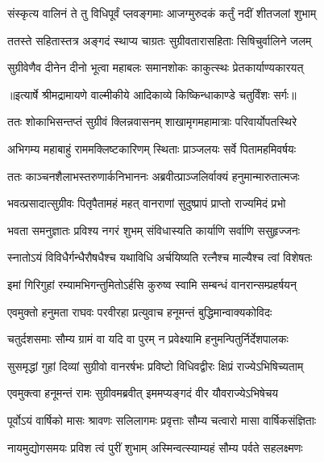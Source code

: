 \twolineshloka
{संस्कृत्य वालिनं ते तु विधिपूर्वं प्लवङ्गमाः}
{आजग्मुरुदकं कर्तुं नदीं शीतजलां शुभाम्} %

\twolineshloka
{ततस्ते सहितास्तत्र अङ्गदं स्थाप्य चाग्रतः}
{सुग्रीवतारासहिताः सिषिचुर्वालिने जलम्} %

\twolineshloka
{सुग्रीवेणैव दीनेन दीनो भूत्वा महाबलः}
{समानशोकः काकुत्स्थः प्रेतकार्याण्यकारयत्} %


{॥इत्यार्षे श्रीमद्रामायणे वाल्मीकीये आदिकाव्ये किष्किन्धाकाण्डे चतुर्विंशः सर्गः॥}


\twolineshloka
{ततः शोकाभिसन्तप्तं सुग्रीवं क्लिन्नवासनम्}
{शाखामृगमहामात्राः परिवार्योपतस्थिरे} %

\twolineshloka
{अभिगम्य महाबाहुं राममक्लिष्टकारिणम्}
{स्थिताः प्राञ्जलयः सर्वे पितामहमिवर्षयः} %

\twolineshloka
{ततः काञ्चनशैलाभस्तरुणार्कनिभाननः}
{अब्रवीत्प्राञ्जलिर्वाक्यं हनुमान्मारुतात्मजः} %

\twolineshloka
{भवत्प्रसादात्सुग्रीवः पितृपैतामहं महत्}
{वानराणां सुदुष्प्रापं प्राप्तो राज्यमिदं प्रभो} %

\twolineshloka
{भवता समनुज्ञातः प्रविश्य नगरं शुभम्}
{संविधास्यति कार्याणि सर्वाणि ससुहृज्जनः} %

\twolineshloka
{स्नातोऽयं विविधैर्गन्धैरौषधैश्च यथाविधि}
{अर्चयिष्यति रत्नैश्च माल्यैश्च त्वां विशेषतः} %

\twolineshloka
{इमां गिरिगुहां रम्यामभिगन्तुमितोऽर्हसि}
{कुरुष्व स्वामि सम्बन्धं वानरान्सम्प्रहर्षयन्} %

\twolineshloka
{एवमुक्तो हनुमता राघवः परवीरहा}
{प्रत्युवाच हनूमन्तं बुद्धिमान्वाक्यकोविदः} %

\twolineshloka
{चतुर्दशसमाः सौम्य ग्रामं वा यदि वा पुरम्}
{न प्रवेक्ष्यामि हनुमन्पितुर्निर्देशपालकः} %

\twolineshloka
{सुसमृद्धां गुहां दिव्यां सुग्रीवो वानरर्षभः}
{प्रविष्टो विधिवद्वीरः क्षिप्रं राज्येऽभिषिच्यताम्} %

\twolineshloka
{एवमुक्त्वा हनूमन्तं रामः सुग्रीवमब्रवीत्}
{इममप्यङ्गदं वीर यौवराज्येऽभिषेचय} %

\twolineshloka
{पूर्वोऽयं वार्षिको मासः श्रावणः सलिलागमः}
{प्रवृत्ताः सौम्य चत्वारो मासा वार्षिकसंज्ञिताः} %

\twolineshloka
{नायमुद्योगसमयः प्रविश त्वं पुरीं शुभाम्}
{अस्मिन्वत्स्याम्यहं सौम्य पर्वते सहलक्ष्मणः} %


